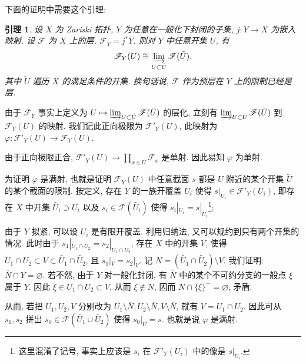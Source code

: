 \documentclass{article}
\theoremstyle{exercise}
\theoremstyle{plain}
\newtheorem*{lemma*}{引理}
\theoremstyle{remark}
\newenvironment{proofc}{\proof}{\endproof}
\def\printfootnotes{}
\def\cF{\mathscr{F}}
\def\clearfootnotes{}
\begin{document}
下面的证明中需要这个引理:
\begin{lemma*}
  设 $X$ 为 Zariski 拓扑, $Y$ 为任意在一般化下封闭的子集, $j \colon Y \to X$ 为嵌入映射.
  设 $\cF$ 为 $X$ 上的层, $\cF_Y = j^*Y$. 则对 $Y$ 中任意开集 $U$, 有
  \[
    \cF_Y(U) \cong \varinjlim_{U \subset \tilde{U}} \cF(\tilde{U}),
  \]
  其中 $\tilde{U}$ 遍历 $X$ 的满足条件的开集.
  换句话说, $\cF$ 作为预层在 $Y$ 上的限制已经是层.
\end{lemma*}

\begin{proofc}
  由于 $\cF_Y$ 事实上定义为 $U \mapsto \varinjlim_{U \subset \tilde{U}} \cF(\tilde{U})$ 的层化,
  立刻有 $\varinjlim_{U \subset \tilde{U}} \cF(\tilde{U})$ 到 $\cF_Y(U)$ 的映射.
  我们记此正向极限为 $\cF'_Y(U)$, 此映射为 $\varphi \colon \cF'_Y(U) \to \cF_Y(U)$.

  由于正向极限正合, $\cF'_Y(U) \to \prod_{x \in U} \cF_x$ 是单射. 因此易知 $\varphi$ 为单射.

  为证明 $\varphi$ 是满射, 也就是证明 $\cF_Y(U)$ 中任意截面 $s$ 都是 $U$ 附近的某个开集 $\tilde{U}$ 的某个截面的限制.
  按定义, 存在 $Y$ 的一族开覆盖 $U_i$ 使得 $s|_{U_i} \in \cF'_Y(U_i)$,
  即存在 $X$ 中开集 $\tilde{U_i} \supset U_i$ 以及 $s_i \in \cF(\tilde{U_i})$
  使得 $s_i|_{U_i} = s|_{U_i}$\footnote{这里混淆了记号, 事实上应该是 $s_i$ 在 $\cF'_Y(U_i)$ 中的像是 $s|_{U_i}$.};

  由于 $Y$ 拟紧, 可以设 $U_i$ 是有限开覆盖. 利用归纳法, 又可以规约到只有两个开集的情况.
  此时由于 $s_1|_{U_1 \cap U_2} = s_2|_{U_1 \cap U_2}$, 存在 $X$ 中的开集 $V$,
  使得 $U_1 \cap U_2 \subset V \subset \tilde{U_1} \cap \tilde{U_2}$,
  且 $s_1|_V = s_2|_V$.
  记 $N = (\tilde{U_1} \cap \tilde{U_2}) \setminus V$. 我们证明: $\overline{N} \cap Y = \varnothing$.
  若不然, 由于 $Y$ 对一般化封闭, 有 $\overline{N}$ 中的某个不可约分支的一般点 $\xi$ 属于 $Y$.
  因此 $\xi \in U_1 \cap U_2 \subset V$, 从而 $\xi \notin N$, 因而 $N \cap \{\xi\}^- = \varnothing$, 矛盾.

  从而, 若把 $U_1, U_2, V$ 分别改为 $U_1 \setminus \overline{N}, U_2 \setminus \overline{N}, V \setminus \overline{N}$,
  就有 $V = U_1 \cap U_2$. 因此可从 $s_1, s_2$ 拼出 $s_0 \in \cF(\tilde{U_1} \cup \tilde{U_2})$
  使得 $s_0|_U = s$. 也就是说 $\varphi$ 是满射. \qedhere
\printfootnotes
\end{proofc}
\clearfootnotes
\end{document}
